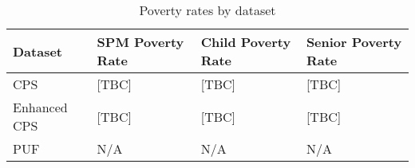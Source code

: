 \begin{table}[h]
    \centering
    \caption{Poverty rates by dataset}
    \label{tab:poverty_metrics}
    \begin{tabular}{llll}
    \toprule
    Dataset & SPM Poverty Rate & Child Poverty Rate & Senior Poverty Rate \\
    \midrule
    CPS & [TBC] & [TBC] & [TBC] \\
    Enhanced CPS & [TBC] & [TBC] & [TBC] \\
    PUF & N/A & N/A & N/A \\
    \bottomrule
    \end{tabular}
\end{table}
